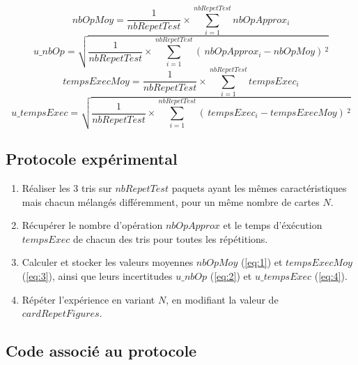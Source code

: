 \documentclass{report}
\begin{document}
\boldmath
\begin{equation} \label{eq:1}
nbOpMoy = \dfrac{1}{nbRepetTest} \times \sum_{i = 1}^{nbRepetTest} nbOpApprox_{i}
\end{equation} 
\begin{equation} \label{eq:2}
	u\_nbOp = \sqrt{\dfrac{1}{nbRepetTest} \times \sum_{i = 1}^{nbRepetTest} (\,nbOpApprox_{i} - nbOpMoy)\,^{2}}
\end{equation} 
\begin{equation} \label{eq:3}
	tempsExecMoy = \dfrac{1}{nbRepetTest} \times \sum_{i = 1}^{nbRepetTest} tempsExec_{i}
\end{equation} 
\begin{equation} \label{eq:4}
	u\_tempsExec = \sqrt{\dfrac{1}{nbRepetTest} \times \sum_{i = 1}^{nbRepetTest} (\,tempsExec_{i} - tempsExecMoy)\,^{2}}
\end{equation} 
\unboldmath

\subsection{Protocole expérimental}

\begin{enumerate}
	\item Réaliser les 3 tris sur $nbRepetTest$ paquets ayant les mêmes caractéristiques mais chacun mélangés différemment, pour un même nombre de cartes $N$.
	\item Récupérer le nombre d'opération $nbOpApprox$ et le temps d'éxécution $tempsExec$ de chacun des tris pour toutes les répétitions.
	\item Calculer et stocker les valeurs moyennes $nbOpMoy$ (\ref{eq:1}) et $tempsExecMoy$ (\ref{eq:3}), ainsi que leurs incertitudes $u\_nbOp$ (\ref{eq:2}) et $u\_tempsExec$ (\ref{eq:4}).
	\item Répéter l'expérience en variant $N$, en modifiant la valeur de $cardRepetFigures$.
\end{enumerate}

\pagebreak
\subsection{Code associé au protocole}
\end{document}
